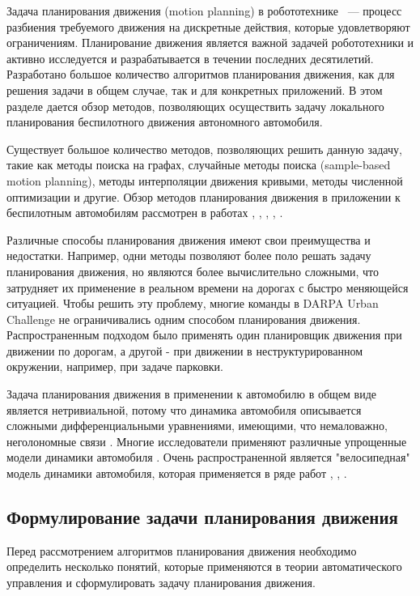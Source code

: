 Задача планирования движения (motion planning) в робототехнике ~--- процесс разбиения требуемого движения
на дискретные действия, которые удовлетворяют ограничениям. Планирование движения является важной задачей
робототехники и активно  исследуется и разрабатывается в течении последних десятилетий. Разработано большое
количество алгоритмов планирования движения, как для решения задачи в общем случае, так и для конкретных
приложений. В этом разделе дается обзор методов, позволяющих осуществить задачу локального планирования
беспилотного движения автономного автомобиля.

Существует большое количество методов, позволяющих решить данную задачу, такие как методы поиска на графах,
случайные методы поиска (sample-based motion planning), методы интерполяции движения кривыми, методы
численной оптимизации и другие. Обзор методов планирования движения в приложении к беспилотным автомобилям
рассмотрен в работах \cite{motion_planning_review},
\cite{motion_planning_overview_obstacles}, \cite{motion_planning_overview_modern},
\cite{motion_planning_review_2}, \cite{motion_planning_review_3}.

Различные способы планирования движения имеют свои преимущества и недостатки. Например, одни методы позволяют
более поло решать задачу планирования движения, но являются более вычислительно сложными, что затрудняет их
применение в реальном времени на дорогах с быстро меняющейся ситуацией.  Чтобы решить эту проблему, многие
команды в DARPA Urban Challenge не ограничивались одним способом планирования движения. Распространенным подходом
было применять один планировщик движения при движении по дорогам, а другой - при движении в неструктурированном окружении,
например, при задаче парковки.

Задача планирования движения в применении к автомобилю в общем виде является нетривиальной, потому что
динамика автомобиля описывается сложными дифференциальными уравнениями, имеющими, что немаловажно,
неголономные связи \cite{car_frund}. Многие исследователи применяют различные упрощенные модели динамики
автомобиля \cite{car_dynamics_1}. Очень распространенной является "велосипедная" модель динамики
автомобиля, которая применяется в ряде работ \cite{car_dynamics_bycicle_model_1}, \cite{car_dynamics_bycicle_model_2},
\cite{darpa_annieway_navigation}.


\subsection{Формулирование задачи планирования движения}
Перед рассмотрением алгоритмов планирования движения необходимо определить несколько понятий, которые
применяются в теории автоматического управления и сформулировать задачу планирования движения.

